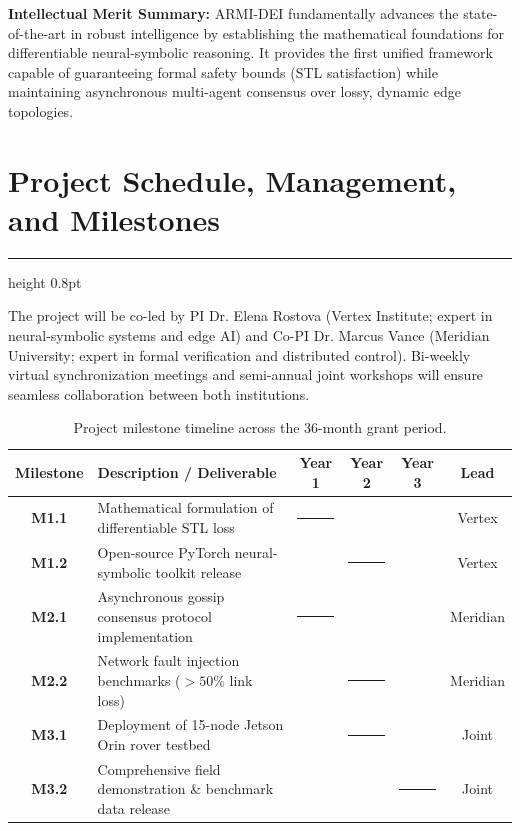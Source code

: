 \documentclass[11pt,letterpaper]{scrartcl}
\newcommand{\sectionline}{%
  \vspace{-0.5em}%
  {\color{NSFNavy}\hrule height 0.8pt}%
  \vspace{0.2em}%
}
\begin{document}
\begin{tcolorbox}[meritbox]
\textbf{Intellectual Merit Summary:} ARMI-DEI fundamentally advances the state-of-the-art in robust intelligence by establishing the mathematical foundations for differentiable neural-symbolic reasoning. It provides the first unified framework capable of guaranteeing formal safety bounds (STL satisfaction) while maintaining asynchronous multi-agent consensus over lossy, dynamic edge topologies.
\end{tcolorbox}

\section{Project Schedule, Management, and Milestones}
\sectionline

The project will be co-led by PI Dr. Elena Rostova (Vertex Institute; expert in neural-symbolic systems and edge AI) and Co-PI Dr. Marcus Vance (Meridian University; expert in formal verification and distributed control). Bi-weekly virtual synchronization meetings and semi-annual joint workshops will ensure seamless collaboration between both institutions.

\begin{table}[h!]
\centering
\sffamily\small
\begin{tabularx}{\textwidth}{@{}c X c c c c@{}}
\toprule
\textbf{Milestone} & \textbf{Description / Deliverable} & \textbf{Year 1} & \textbf{Year 2} & \textbf{Year 3} & \textbf{Lead} \\
\midrule
\textbf{M1.1} & Mathematical formulation of differentiable STL loss & {\color{NSFNavy}\rule{1.2ex}{1.2ex}} & & & Vertex \\
\textbf{M1.2} & Open-source PyTorch neural-symbolic toolkit release & & {\color{NSFNavy}\rule{1.2ex}{1.2ex}} & & Vertex \\
\textbf{M2.1} & Asynchronous gossip consensus protocol implementation & {\color{NSFTeal}\rule{1.2ex}{1.2ex}} & & & Meridian \\
\textbf{M2.2} & Network fault injection benchmarks ($>50\%$ link loss) & & {\color{NSFTeal}\rule{1.2ex}{1.2ex}} & & Meridian \\
\textbf{M3.1} & Deployment of 15-node Jetson Orin rover testbed & & {\color{NSFNavy}\rule{1.2ex}{1.2ex}} & & Joint \\
\textbf{M3.2} & Comprehensive field demonstration \& benchmark data release & & & {\color{NSFAmber}\rule{1.2ex}{1.2ex}} & Joint \\
\bottomrule
\end{tabularx}
\caption{Project milestone timeline across the 36-month grant period.}
\label{tab:milestones}
\end{table}
\end{document}
